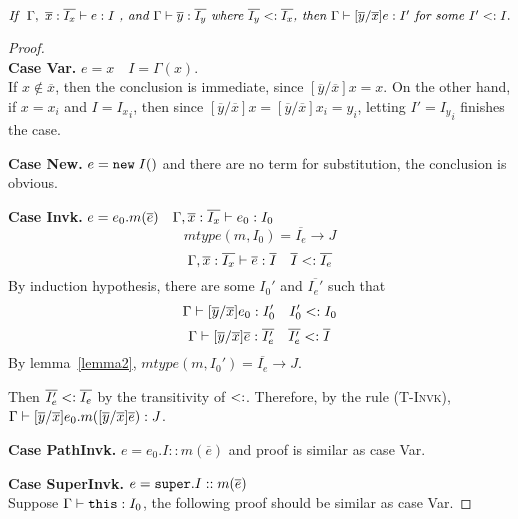 \begin{lemma}~\label{lemma1}
$\textit{If } \ \judgeewf {\Gamma, \ \overline{x}:\overline{I_x}} { e : I } \textit{ , and }
\judgeewf {\Gamma} {\overline{y}:\overline{I_y}} \textit{ where } \overline{I_y} \subtype \overline{I_x}
\textit{, then } \judgeewf {\Gamma} {[\overline{y}/\overline{x}]e : I'} \textit{ for some } I' \subtype I.
$

\begin{proof}~\\
\noindent \textbf{Case Var.}
$ e = x \quad I = \Gamma(x) $. \\
If $x \notin \overline{x}$, then the conclusion is immediate, since $[\overline{y}/\overline{x}]x = x$.
On the other hand, if $x = x_i$ and $I = {I_x}_i$, then since $[\overline{y}/\overline{x}]x = [\overline{y}/\overline{x}]x_i = y_i$,
letting $I' = {I_y}_i$ finishes the case.

\noindent \textbf{Case New.}
$e = \texttt{new} \; I()$ and there are no term for substitution, the conclusion is obvious.

\noindent \textbf{Case Invk.}
$ e = e_0.m(\overline{e}) \quad
  \Gamma, \overline{x}:\overline{I_x} \; {\vdash} \; e_0 : I_0 $
$$ mtype(m, I_0) = \overline{I_e} \rightarrow J $$
$$ \Gamma, \overline{x}:\overline{I_x} \; {\vdash} \; \overline{e}:\overline{I} \quad
    \overline{I} <: \overline{I_e} $$
By induction hypothesis, there are some $I_0'$ and $\overline{I_e'}$ such that
    $$ \Gamma \; {\vdash} \; [\overline{y}/\overline{x}]e_0 : I_0' \quad 
        I_0' <: I_0 $$
    $$ \Gamma \; {\vdash} \; [\overline{y}/\overline{x}]\overline{e} : \overline{I_e'} \quad  
        \overline{I_e'} <: \overline{I}$$    
By lemma~\ref{lemma2}, 
    $mtype(m, I_0') = \overline{I_e} \rightarrow J$.
    
\noindent Then $\overline{I_e'} <: \overline{I_e}$ by the transitivity of $<:$.
Therefore, by the rule \textsc{(T-Invk)}, 
    $\Gamma \; {\vdash} \; [\overline{y}/\overline{x}]e_0.m([\overline{y}/\overline{x}]\overline{e}) : J$.

\noindent \textbf{Case PathInvk.}
$ e = e_0.I::m(\overline{e}) $ and proof is similar as case Var.

\noindent \textbf{Case SuperInvk.}
$ e = \texttt{super}.I::m(\overline{e}) $ \\
Suppose $\Gamma \; {\vdash} \; \texttt{this} : I_0$, the following proof should be similar as case Var.


\end{proof}
\end{lemma}
